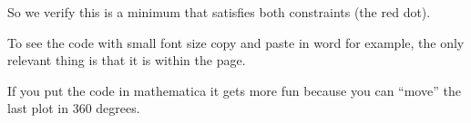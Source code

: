 So we verify this is a minimum that satisfies both constraints (the red dot).

To see the code with small font size copy and paste in word for example, the only relevant thing is that it is within the page.

If you put the code in mathematica it gets more fun because you can ``move'' the last plot in 360 degrees.
